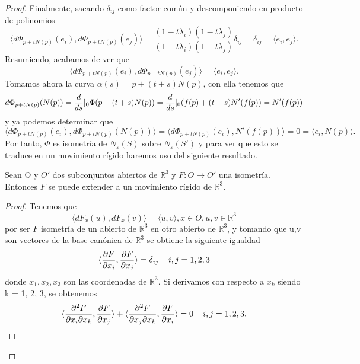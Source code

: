 \begin{proof}
	Finalmente, sacando $\delta_{ij}$ como factor común y descomponiendo en producto de polinomios
	${ }$\\
	\[
	\langle d\Phi_{p + tN(p)}(e_i), d\Phi_{p + tN(p)}(e_j) \rangle = \frac{(1 - t\lambda_i)(1 - t\lambda_j)}{(1 - t\lambda_i)(1 - t\lambda_j)}\delta_{ij} = \delta_{ij} = \langle e_i, e_j \rangle.
	\]
	${ }$\\
	
	Resumiendo, acabamos de ver que
	${ }$\\
	\[
	\langle d\Phi_{p + tN(p)}(e_i), d\Phi_{p + tN(p)}(e_j) \rangle = \langle e_i, e_j\rangle.
	\]
	${ }$\\
	
	Tomamos ahora la curva $\alpha(s) = p + (t + s)N(p)$, con ella tenemos que
	${ }$\\
	\[
	d\Phi_{p + tN(p)}(N(p)) = \frac{d}{ds}\arrowvert_0\Phi(p + (t + s)N(p)) = \frac{d}{ds}\arrowvert_0(f(p) + (t + s)N'(f(p)) = N'(f(p))
	\]
	${ }$\\
	y ya podemos determinar que
	${ }$\\
	\[
	 \langle d\Phi_{p + tN(p)}(e_i), d\Phi_{p + tN(p)}(N(p)) \rangle = \langle d\Phi_{p + tN(p)}(e_i), N'(f(p)) \rangle = 0 = \langle e_i, N(p) \rangle.
	\]
	${ }$\\
	
	Por tanto, $\Phi$ es isometría de $N_\varepsilon(S)$ sobre $N_\varepsilon(S')$ y para ver que esto se traduce en un movimiento rígido haremos uso del siguiente resultado.
	${ }$\\
	
	\begin{teorema}
		Sean O y $O'$ dos subconjuntos abiertos de $\mathbb{R}^3$ y $F : O \to O'$ una isometría. Entonces $F$ se puede extender a un movimiento rígido de $\mathbb{R}^3$.
	\end{teorema}
	
	\begin{proof}
		Tenemos que
		${ }$\\
		\[
		\langle dF_x(u), dF_x(v) \rangle = \langle u, v \rangle , x \in O, u,v \in \mathbb{R}^3
		\]
		${ }$\\
		por ser $F$ isometría de un abierto de $\mathbb{R}^3$ en otro abierto de $\mathbb{R}^3$, y tomando que u,v son vectores de la base canónica de $\mathbb{R}^3$ se obtiene la siguiente igualdad
		${ }$\\
		\[
		\langle \frac{\partial F}{\partial x_i}, \frac{\partial F}{\partial x_j} \rangle = \delta_{ij} \thinspace \thinspace \thinspace \thinspace \thinspace \thinspace \thinspace i,j = 1,2,3
		\]
		${ }$\\
 		donde $x_1, x_2, x_3$ son las coordenadas de $\mathbb{R}^3$. Si derivamos con respecto a $x_k$ siendo k = 1, 2, 3, se obtenemos
 		${ }$\\
		\[
		\langle\frac{\partial^2 F}{\partial x_i \partial x_k}, \frac{\partial F}{\partial x_j} \rangle + \langle \frac{\partial^2 F}{\partial x_j \partial x_k}, \frac{\partial F}{\partial x_i} \rangle = 0 \thinspace \thinspace \thinspace \thinspace \thinspace \thinspace \thinspace i,j = 1,2,3.
		\]
		${ }$\\
		

\end{proof}
\end{proof}
